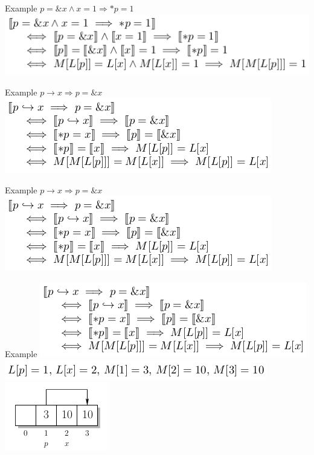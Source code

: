 \documentclass{beamer}
\begin{document}
\begin{frame}{Example}
$p = \&x \wedge x = 1 \Rightarrow *p = 1$\newline
\includegraphics[scale=0.5]{ex_good.png}\newline
\end{frame}

\begin{frame}{Example}
$p \rightarrow x \Rightarrow p = \&x$\newline
\includegraphics[scale=0.5]{ex_bad1.png}\newline
\end{frame}

\begin{frame}{Example}
$p \rightarrow x \Rightarrow p = \&x$\newline
\includegraphics[scale=0.5]{ex_bad1.png}\newline
\end{frame}

\begin{frame}{Example}
\includegraphics[scale=0.5]{ex_bad1.png}\newline
\includegraphics[scale=0.5]{ex_bad2.png}\newline
\includegraphics[scale=0.5]{ex_bad3.png}\newline
\end{frame}
\end{document}
